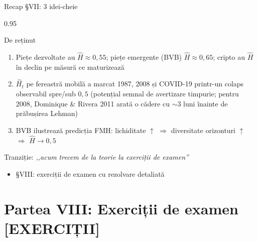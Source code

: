 \documentclass[9pt, aspectratio=169, t]{beamer}
\begin{document}
\begin{frame}[shrink=15]{Recap §VII: 3 idei-cheie}
\begin{cminipage}{0.95\textwidth}
\begin{block}{De reținut}
\begin{enumerate}\setlength{\itemsep}{4pt}
    \item Piețe dezvoltate au $\hat H\approx 0{,}55$; piețe emergente (BVB) $\hat H\approx 0{,}65$; cripto au $\hat H$ în declin pe măsură ce maturizează
    \item $\hat H_t$ pe fereastră mobilă a marcat 1987, 2008 și COVID-19 printr-un colaps observabil spre/sub $0{,}5$ (potențial semnal de avertizare timpurie; pentru 2008, Dominique \& Rivera 2011 arată o cădere cu $\sim$3 luni înainte de prăbușirea Lehman)
    \item BVB ilustrează predicția FMH: lichiditate $\uparrow$ $\Rightarrow$ diversitate orizonturi $\uparrow$ $\Rightarrow$ $\hat H\to 0{,}5$
\end{enumerate}
\end{block}
\begin{exampleblock}{Tranziție: \textit{,,acum trecem de la teorie la exerciții de examen''}}
\begin{itemize}\setlength{\itemsep}{0pt}
    \item §VIII: exerciții de examen cu rezolvare detaliată
\end{itemize}
\end{exampleblock}
\end{cminipage}
\end{frame}

\section{Partea VIII: Exerciții de examen [EXERCIȚII]}
\end{document}

